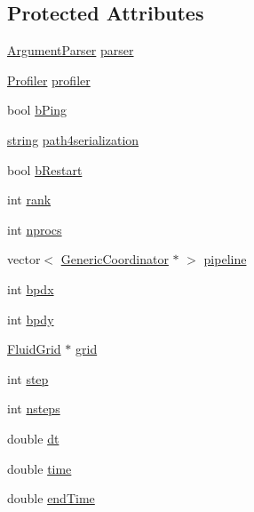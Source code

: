 \subsection*{Protected Attributes}
\begin{DoxyCompactItemize}
\item 
\hyperlink{class_argument_parser}{Argument\+Parser} \hyperlink{class_simulation___fluid_a0162c8af40a215e4272d9e35e2f3e6ee}{parser}
\item 
\hyperlink{class_profiler}{Profiler} \hyperlink{class_simulation___fluid_a301b3bc8d7130dab2257cd2290584a7a}{profiler}
\item 
bool \hyperlink{class_simulation___fluid_a093e36d6455bfc4b4d20dd60daebce2b}{b\+Ping}
\item 
\hyperlink{testfpzip_8cpp_a984bb8e04129c4268bd6ff36a50c9fa4}{string} \hyperlink{class_simulation___fluid_a8ec0520dc7e500c4ed9b61b7bd9b6527}{path4serialization}
\item 
bool \hyperlink{class_simulation___fluid_a96bd924b4b85af0f27936b50815b4ddd}{b\+Restart}
\item 
int \hyperlink{class_simulation___fluid_adaf54dc1ebc0dca54f5a2bf0a57297f4}{rank}
\item 
int \hyperlink{class_simulation___fluid_af400eff34f1cf92caedd30c5badf8870}{nprocs}
\item 
vector$<$ \hyperlink{class_generic_coordinator}{Generic\+Coordinator} $\ast$ $>$ \hyperlink{class_simulation___fluid_ab11e0ce3a22abe76cbeea91c8d3b90fd}{pipeline}
\item 
int \hyperlink{class_simulation___fluid_afdba1d2d803600ad9054385935eeeb39}{bpdx}
\item 
int \hyperlink{class_simulation___fluid_a30e4b932f8305919ccc1243de639d047}{bpdy}
\item 
\hyperlink{_definitions_8h_aff3288a3741f5098bcc456bb13440189}{Fluid\+Grid} $\ast$ \hyperlink{class_simulation___fluid_a16124c906622008dc3e1a798e5c78a4b}{grid}
\item 
int \hyperlink{class_simulation___fluid_a413104a68456556da195430ec33aa885}{step}
\item 
int \hyperlink{class_simulation___fluid_abe7ce8f7e473422020cd6be97bdf4150}{nsteps}
\item 
double \hyperlink{class_simulation___fluid_ad7aa765d258a0ba11c46893884960173}{dt}
\item 
double \hyperlink{class_simulation___fluid_a743ea183f44eff7da35f693520f84bc8}{time}
\item 
double \hyperlink{class_simulation___fluid_ac906e2f929cbe802d4dc6bcf0dbb989d}{end\+Time}

\end{DoxyCompactItemize}
